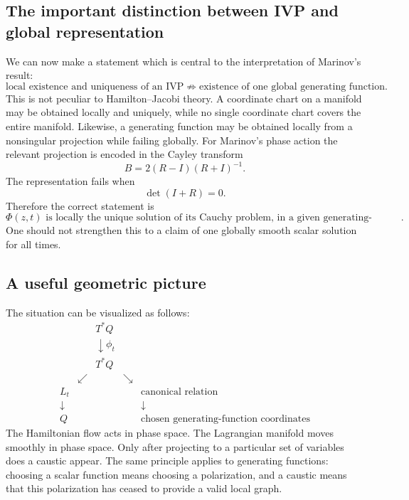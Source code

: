 \subsection{The important distinction between IVP and global representation}
We can now make a statement which is central to the interpretation of
Marinov's result:
\begin{equation}
\boxed{
\text{local existence and uniqueness of an IVP}
\not\Rightarrow
\text{existence of one global generating function}.
}
\end{equation}
This is not peculiar to Hamilton--Jacobi theory.
A coordinate chart on a manifold may be obtained locally and uniquely, while
no single coordinate chart covers the entire manifold.
Likewise, a generating function may be obtained locally from a nonsingular
projection while failing globally.
For Marinov's phase action the relevant projection is encoded in the Cayley
transform
\begin{equation}
B=2(R-I)(R+I)^{-1}.
\end{equation}
The representation fails when
\begin{equation}
\det(I+R)=0.
\end{equation}
Therefore the correct statement is
\begin{equation}
\boxed{
\Phi(z,t)\text{ is locally the unique solution of its Cauchy problem,
in a given generating-function chart}.
}
\end{equation}
One should not strengthen this to a claim of one globally smooth scalar
solution for all times.
\subsection{A useful geometric picture}
The situation can be visualized as follows:
\begin{equation}
\begin{array}{ccccc}
&&T^*Q&&\\
&&\downarrow\phi_t&&\\
&&T^*Q&&\\[1mm]
&\swarrow&&\searrow&\\
L_t&&&&\text{canonical relation}\\
\downarrow&&&&\downarrow\\
Q&&&&\text{chosen generating-function coordinates}
\end{array}
\end{equation}
The Hamiltonian flow acts in phase space.
The Lagrangian manifold moves smoothly in phase space.
Only after projecting to a particular set of variables does a caustic appear.
The same principle applies to generating functions: choosing a scalar
function means choosing a polarization, and a caustic means that this
polarization has ceased to provide a valid local graph.
